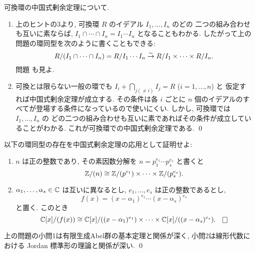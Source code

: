 \documentclass[12pt,twoside]{jarticle}
\begin{document}
\begin{rem}
 可換環の中国式剰余定理について.
 \begin{enumerate}
  \item 上のヒントの3より, 
   可換環 $R$ のイデアル $I_1,\ldots,I_n$ のどの
   二つの組み合わせも互いに素ならば, %
   $I_1\cap\cdots\cap I_n=I_1\cdots I_n$ となることもわかる.
   したがって上の問題の環同型を次のように書くこともできる:
   \begin{equation*}
    R/(I_1\cap\cdots\cap I_n) 
    = R/I_1\cdots I_n 
    \overset\sim\rightarrow R/I_1\times\cdots\times R/I_n.
   \end{equation*}
   問題  も見よ.
  \item 可換とは限らない一般の環でも %
   $I_i+\bigcap_{j(\ne i)}I_j=R$ ($i=1,\ldots,n$) と
   仮定すれば中国式剰余定理が成立する. その条件は各 $i$ ごとに %
   $n$ 個のイデアルのすべてが登場する条件になっているので使いにくい.
   しかし, 可換環では $I_1,\ldots,I_n$ の
   どの二つの組み合わせも互いに素であればその条件が成立していることがわかる.
   これが可換環での中国式剰余定理である.
 \qed
 \end{enumerate}
\end{rem}

\begin{question}
\label{q:CRT-Z,K[x]}
 以下の環同型の存在を中国式剰余定理の応用として証明せよ:
 \begin{enumerate}
  \item $n$ は正の整数であり, その素因数分解を $n=p_1^{e_1}\cdots p_s^{e_s}$ 
   と書くと
   \begin{equation*}
    {\mathbb Z}/(n)\cong {\mathbb Z}/(p^{e_1})\times\cdots\times{\mathbb Z}/(p_s^{e_s}).
   \end{equation*}
  \item $\alpha_1,\ldots,\alpha_s\in{\mathbb C}$ は互いに異なるとし, %
   $e_1,\ldots,e_s$ は正の整数であるとし, 
   \begin{equation*}
    f(x)=(x-\alpha_1)^{e_1}\cdots(x-\alpha_s)^{e_s}
   \end{equation*}
   と置く. このとき
   \begin{equation*}
    \C[x]/(f(x)) \cong 
    \C[x]/((x-\alpha_1)^{e_1})\times\cdots\times\C[x]/((x-\alpha_s)^{e_s}).
   \qed
   \end{equation*}
 \end{enumerate}
\end{question}

\begin{rem}
 上の問題の小問1は有限生成Abel群の基本定理と関係が深く, 
 小問2は線形代数における Jordan 標準形の理論と関係が深い.
 \qed
\end{rem}
\end{document}
